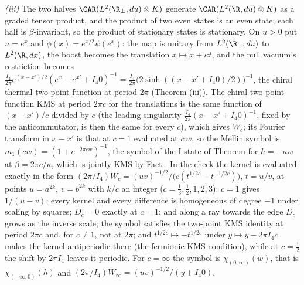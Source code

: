 \emph{(iii)} The two halves $\CAR(L^{2}(\R_{\pm}, du)\otimes K)$ generate $\CAR(L^{2}(\R, du)\otimes K)$ as a graded tensor product, and the product of two even states is an even state; each half is $\beta$-invariant, so the product of stationary states is stationary. On $u > 0$ put $u = e^{x}$ and $\phi(x) = e^{x/2}\psi(e^{x})$: the map is unitary from $L^{2}(\R_{+}, du)$ to $L^{2}(\R, dx)$, the boost becomes the translation $x \mapsto x + \kappa t$, and the null vacuum's restriction becomes $\tfrac{I_{4}}{2\pi}e^{(x + x')/2}(e^{x} - e^{x'} + I_{4}0)^{-1} = \tfrac{I_{4}}{2\pi}\big(2\sinh((x - x' + I_{4}0)/2)\big)^{-1}$, the chiral thermal two-point function at period $2\pi$ (Theorem (iii)). The chiral two-point function KMS at period $2\pi c$ for the translations is the same function of $(x - x')/c$ divided by $c$ (the leading singularity $\tfrac{I_{4}}{2\pi}(x - x' + I_{4}0)^{-1}$, fixed by the anticommutator, is then the same for every $c$), which gives $W_{c}$; its Fourier transform in $x - x'$ is that at $c = 1$ evaluated at $c\,w$, so the Mellin symbol is $m_{1}(c w) = (1 + e^{-2\pi c w})^{-1}$, the symbol of the I-state of Theorem  for $h = -\kappa w$ at $\beta = 2\pi c/\kappa$, which is jointly KMS by Fact . In the check the kernel is evaluated exactly in the form $(2\pi/I_{4})W_{c} = (uv)^{-1/2}/\big(c(t^{1/2c} - t^{-1/2c})\big)$, $t = u/v$, at points $u = a^{2k}$, $v = b^{2k}$ with $k/c$ an integer ($c = \tfrac13, \tfrac12, 1, 2, 3$): $c = 1$ gives $1/(u - v)$; every kernel and every difference is homogeneous of degree $-1$ under scaling by squares; $D_{c} = 0$ exactly at $c = 1$; and along a ray towards the edge $D_{c}$ grows as the inverse scale; the symbol satisfies the two-point KMS identity at period $2\pi c$ and, for $c \neq 1$, not at $2\pi$; and $t^{1/2c} \mapsto -t^{1/2c}$ under $y \mapsto y - 2\pi I_{4}c$ makes the kernel antiperiodic there (the fermionic KMS condition), while at $c = \tfrac12$ the shift by $2\pi I_{4}$ leaves it periodic. For $c = \infty$ the symbol is $\chi_{(0, \infty)}(w)$, that is $\chi_{(-\infty, 0)}(h)$ and $(2\pi/I_{4})W_{\infty} = (uv)^{-1/2}/(y + I_{4}0)$.

